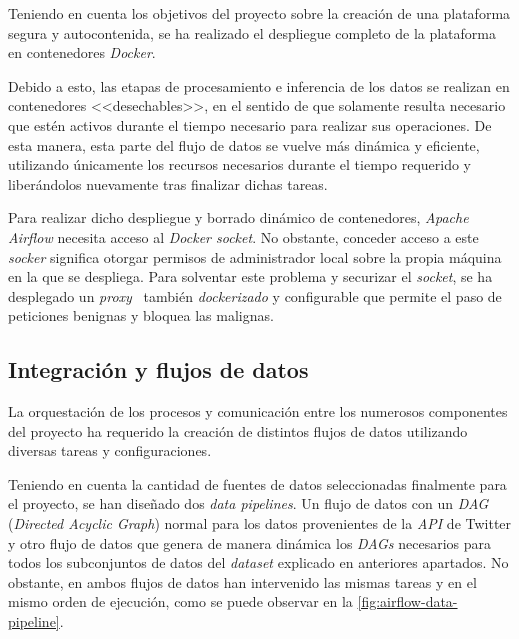 Teniendo en cuenta los objetivos del proyecto sobre la creación de una plataforma segura y autocontenida, se ha realizado el despliegue completo de la plataforma en contenedores \textit{Docker}.

Debido a esto, las etapas de procesamiento e inferencia de los datos se realizan en contenedores <<desechables>>, en el sentido de que solamente resulta necesario que estén activos durante el tiempo necesario para realizar sus operaciones. De esta manera, esta parte del flujo de datos se vuelve más dinámica y eficiente, utilizando únicamente los recursos necesarios durante el tiempo requerido y liberándolos nuevamente tras finalizar dichas tareas.

Para realizar dicho despliegue y borrado dinámico de contenedores, \textit{Apache Airflow} necesita acceso al \textit{Docker socket}. No obstante, conceder acceso a este \textit{socker} significa otorgar permisos de administrador local sobre la propia máquina en la que se despliega. Para solventar este problema y securizar el \textit{socket}, se ha desplegado un \textit{proxy}~\cite{dockerProxy} también \textit{dockerizado} y configurable que permite el paso de peticiones benignas y bloquea las malignas.

\subsection{Integración y flujos de datos}

La orquestación de los procesos y comunicación entre los numerosos componentes del proyecto ha requerido la creación de distintos flujos de datos utilizando diversas tareas y configuraciones.

Teniendo en cuenta la cantidad de fuentes de datos seleccionadas finalmente para el proyecto, se han diseñado dos \textit{data pipelines}. Un flujo de datos con un \textit{DAG} (\textit{Directed Acyclic Graph}) normal para los datos provenientes de la \textit{API} de Twitter y otro flujo de datos que genera de manera dinámica los \textit{DAGs} necesarios para todos los subconjuntos de datos del \textit{dataset} explicado en anteriores apartados. No obstante, en ambos flujos de datos han intervenido las mismas tareas y en el mismo orden de ejecución, como se puede observar en la \autoref{fig:airflow-data-pipeline}.


